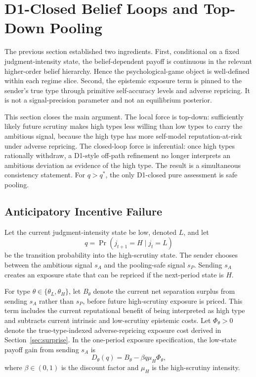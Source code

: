 
\section{D1-Closed Belief Loops and Top-Down Pooling}
\label{sec:belief-loop}

The previous section established two ingredients. First, conditional on a fixed judgment-intensity state, the belief-dependent payoff is continuous in the relevant higher-order belief hierarchy. Hence the psychological-game object is well-defined within each regime slice. Second, the epistemic exposure term is pinned to the sender's true type through primitive self-accuracy levels and adverse repricing. It is not a signal-precision parameter and not an equilibrium posterior.

This section closes the main argument. The local force is top-down: sufficiently likely future scrutiny makes high types less willing than low types to carry the ambitious signal, because the high type has more self-model reputation-at-risk under adverse repricing. The closed-loop force is inferential: once high types rationally withdraw, a D1-style off-path refinement no longer interprets an ambitious deviation as evidence of the high type. The result is a simultaneous consistency statement. For \(q>q^*\), the only D1-closed pure assessment is safe pooling.

\subsection{Anticipatory Incentive Failure}
\label{subsec:anticipatory-incentive-failure}

Let the current judgment-intensity state be low, denoted \(L\), and let
\[
q=\Pr(j_{t+1}=H\mid j_t=L)
\]
be the transition probability into the high-scrutiny state. The sender chooses between the ambitious signal \(s_A\) and the pooling-safe signal \(s_P\). Sending \(s_A\) creates an exposure state that can be repriced if the next-period state is \(H\).

For type \(\theta\in\{\theta_L,\theta_H\}\), let \(B_\theta\) denote the current net separation surplus from sending \(s_A\) rather than \(s_P\), before future high-scrutiny exposure is priced. This term includes the current reputational benefit of being interpreted as high type and subtracts current intrinsic and low-scrutiny epistemic costs. Let \(\Phi_\theta>0\) denote the true-type-indexed adverse-repricing exposure cost derived in Section~\ref{sec:surprise}. In the one-period exposure specification, the low-state payoff gain from sending \(s_A\) is
\[
D_\theta(q)=B_\theta-\beta q\mu_H\Phi_\theta,
\]
where \(\beta\in(0,1)\) is the discount factor and \(\mu_H\) is the high-scrutiny intensity.

